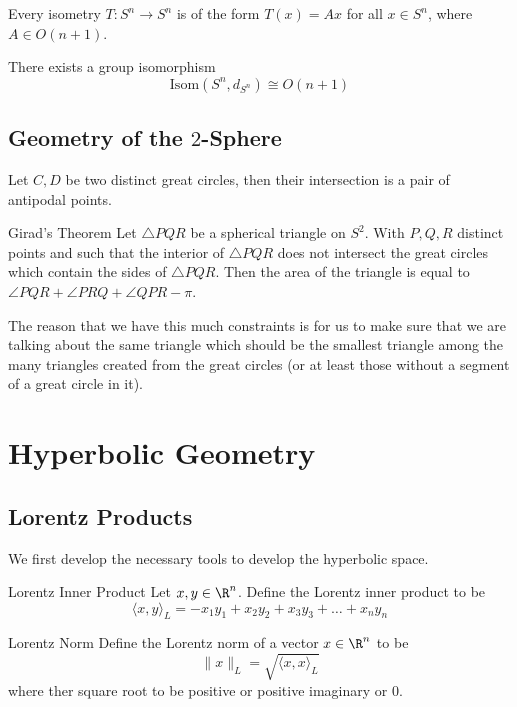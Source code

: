 \documentclass[a4paper]{article}
\begin{document}
\begin{prp}{}{} Every isometry $T:S^n\to S^n$ is of the form $T(x)=Ax$ for all $x\in S^n$, where $A\in O(n+1)$. 
\end{prp}

\begin{crl}{}{} There exists a group isomorphism $$\text{Isom}(S^n,d_{S^n})\cong O(n+1) $$
\end{crl}

\subsection{Geometry of the $2$-Sphere}
\begin{prp}{}{} Let $C,D$ be two distinct great circles, then their intersection is a pair of antipodal points. 
\end{prp}

\begin{thm}{Girad's Theorem}{} Let $\triangle PQR$ be a spherical triangle on $S^2$. With $P,Q,R$ distinct points and such that the interior of $\triangle PQR$ does not intersect the great circles which contain the sides of $\triangle PQR$. Then the area of the triangle is equal to $\angle PQR+\angle PRQ+\angle QPR-\pi$. 
\end{thm}

The reason that we have this much constraints is for us to make sure that we are talking about the same triangle which should be the smallest triangle among the many triangles created from the great circles (or at least those without a segment of a great circle in it). 

\pagebreak
\section{Hyperbolic Geometry}
\subsection{Lorentz Products}
We first develop the necessary tools to develop the hyperbolic space. 
\begin{defn}{Lorentz Inner Product}{} Let $x,y\in\R^n$. Define the Lorentz inner product to be $$\langle x,y\rangle_L=-x_1y_1+x_2y_2+x_3y_3+\dots+x_ny_n$$
\end{defn}

\begin{defn}{Lorentz Norm}{} Define the Lorentz norm of a vector $x\in\R^n$ to be $$\|x\|_L=\sqrt{\langle x,x\rangle_L}$$ where ther square root to be positive or positive imaginary or $0$. 
\end{defn}
\end{document}
